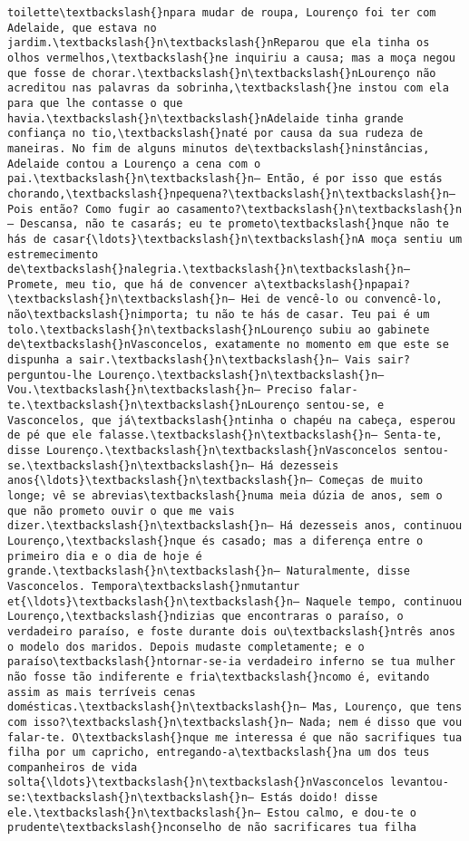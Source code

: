\begin{Verbatim}[commandchars=\\\{\}]
toilette\textbackslash{}npara mudar de roupa, Lourenço foi ter com Adelaide, que estava no jardim.\textbackslash{}n\textbackslash{}nReparou que ela tinha os olhos vermelhos,\textbackslash{}ne inquiriu a causa; mas a moça negou que fosse de chorar.\textbackslash{}n\textbackslash{}nLourenço não acreditou nas palavras da sobrinha,\textbackslash{}ne instou com ela para que lhe contasse o que havia.\textbackslash{}n\textbackslash{}nAdelaide tinha grande confiança no tio,\textbackslash{}naté por causa da sua rudeza de maneiras. No fim de alguns minutos de\textbackslash{}ninstâncias, Adelaide contou a Lourenço a cena com o pai.\textbackslash{}n\textbackslash{}n— Então, é por isso que estás chorando,\textbackslash{}npequena?\textbackslash{}n\textbackslash{}n— Pois então? Como fugir ao casamento?\textbackslash{}n\textbackslash{}n— Descansa, não te casarás; eu te prometo\textbackslash{}nque não te hás de casar{\ldots}\textbackslash{}n\textbackslash{}nA moça sentiu um estremecimento de\textbackslash{}nalegria.\textbackslash{}n\textbackslash{}n— Promete, meu tio, que há de convencer a\textbackslash{}npapai?\textbackslash{}n\textbackslash{}n— Hei de vencê-lo ou convencê-lo, não\textbackslash{}nimporta; tu não te hás de casar. Teu pai é um tolo.\textbackslash{}n\textbackslash{}nLourenço subiu ao gabinete de\textbackslash{}nVasconcelos, exatamente no momento em que este se dispunha a sair.\textbackslash{}n\textbackslash{}n— Vais sair? perguntou-lhe Lourenço.\textbackslash{}n\textbackslash{}n— Vou.\textbackslash{}n\textbackslash{}n— Preciso falar-te.\textbackslash{}n\textbackslash{}nLourenço sentou-se, e Vasconcelos, que já\textbackslash{}ntinha o chapéu na cabeça, esperou de pé que ele falasse.\textbackslash{}n\textbackslash{}n— Senta-te, disse Lourenço.\textbackslash{}n\textbackslash{}nVasconcelos sentou-se.\textbackslash{}n\textbackslash{}n— Há dezesseis anos{\ldots}\textbackslash{}n\textbackslash{}n— Começas de muito longe; vê se abrevias\textbackslash{}numa meia dúzia de anos, sem o que não prometo ouvir o que me vais dizer.\textbackslash{}n\textbackslash{}n— Há dezesseis anos, continuou Lourenço,\textbackslash{}nque és casado; mas a diferença entre o primeiro dia e o dia de hoje é grande.\textbackslash{}n\textbackslash{}n— Naturalmente, disse Vasconcelos. Tempora\textbackslash{}nmutantur et{\ldots}\textbackslash{}n\textbackslash{}n— Naquele tempo, continuou Lourenço,\textbackslash{}ndizias que encontraras o paraíso, o verdadeiro paraíso, e foste durante dois ou\textbackslash{}ntrês anos o modelo dos maridos. Depois mudaste completamente; e o paraíso\textbackslash{}ntornar-se-ia verdadeiro inferno se tua mulher não fosse tão indiferente e fria\textbackslash{}ncomo é, evitando assim as mais terríveis cenas domésticas.\textbackslash{}n\textbackslash{}n— Mas, Lourenço, que tens com isso?\textbackslash{}n\textbackslash{}n— Nada; nem é disso que vou falar-te. O\textbackslash{}nque me interessa é que não sacrifiques tua filha por um capricho, entregando-a\textbackslash{}na um dos teus companheiros de vida solta{\ldots}\textbackslash{}n\textbackslash{}nVasconcelos levantou-se:\textbackslash{}n\textbackslash{}n— Estás doido! disse ele.\textbackslash{}n\textbackslash{}n— Estou calmo, e dou-te o prudente\textbackslash{}nconselho de não sacrificares tua filha 
\end{Verbatim}
